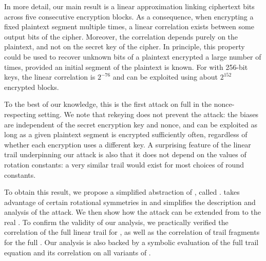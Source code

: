 In more detail, our main result is a linear approximation \cite{eurocryptMatsui93,eurocryptMatsuiY92} linking ciphertext bits across five consecutive encryption blocks.
As a consequence, when encrypting a fixed plaintext segment multiple times, a linear correlation exists between some output bits of the cipher.
Moreover, the correlation depends purely on the plaintext, and not on the secret key of the cipher.
In principle, this property could be used to recover unknown bits of a plaintext encrypted a large number of times, provided an initial segment of the plaintext is known.
For \MORUS[1280] with 256-bit keys, the linear correlation is $2^{-76}$
and can be exploited using about $2^{152}$ encrypted blocks.

To the best of our knowledge, this is the first attack on full \MORUS in the nonce-respecting setting.
We note that rekeying does not prevent the attack: the biases are independent of the secret encryption key and nonce, and can be exploited as long as a given plaintext segment is encrypted sufficiently often, regardless of whether each encryption uses a different key.
A surprising feature of the linear trail underpinning our attack is also that it does not depend on the values of rotation constants: a very similar trail would exist for most choices of round constants.

To obtain this result, we propose a simplified abstraction of \MORUS, called \MiniMORUS. \MiniMORUS takes advantage of certain rotational symmetries in \MORUS and simplifies the description and analysis of the attack. We then show how the attack can be extended from \MiniMORUS to the real \MORUS.
To confirm the validity of our analysis,
we practically verified the correlation of the full linear trail for \MiniMORUS, as well as the correlation of trail fragments for the full \MORUS.
Our analysis is also backed by a symbolic evaluation of the full trail equation and its correlation on all variants of \MORUS.

